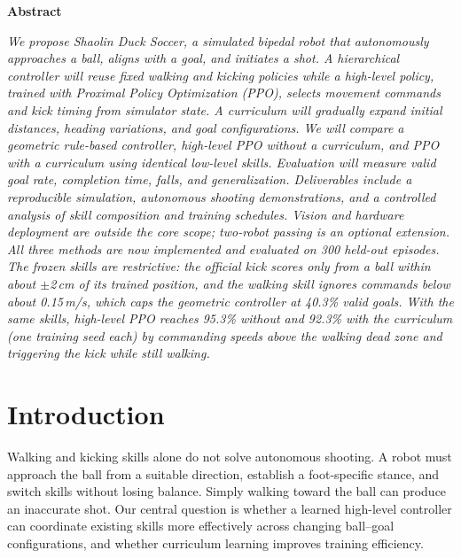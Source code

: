 \documentclass[10pt,twocolumn,letterpaper]{article}
\newcommand{\new}[1]{{\color{blue}#1}}
\begin{document}

\begin{center}\bfseries Abstract\end{center}
\noindent\textit{We propose Shaolin Duck Soccer, a simulated bipedal robot that autonomously approaches a ball, aligns with a goal, and initiates a shot. A hierarchical controller will reuse fixed walking and kicking policies while a high-level policy, trained with Proximal Policy Optimization (PPO), selects movement commands and kick timing from simulator state. A curriculum will gradually expand initial distances, heading variations, and goal configurations. We will compare a geometric rule-based controller, high-level PPO without a curriculum, and PPO with a curriculum using identical low-level skills. Evaluation will measure valid goal rate, completion time, falls, and generalization. Deliverables include a reproducible simulation, autonomous shooting demonstrations, and a controlled analysis of skill composition and training schedules. Vision and hardware deployment are outside the core scope; two-robot passing is an optional extension.
\new{All three methods are now implemented and evaluated on 300 held-out episodes. The frozen skills are restrictive: the official kick scores only from a ball within about $\pm$2\,cm of its trained position, and the walking skill ignores commands below about 0.15\,m/s, which caps the geometric controller at 40.3\% valid goals. With the same skills, high-level PPO reaches 95.3\% without and 92.3\% with the curriculum (one training seed each) by commanding speeds above the walking dead zone and triggering the kick while still walking.}}

\section{Introduction}
Walking and kicking skills alone do not solve autonomous shooting. A robot must approach the ball from a suitable direction, establish a foot-specific stance, and switch skills without losing balance. Simply walking toward the ball can produce an inaccurate shot. Our central question is whether a learned high-level controller can coordinate existing skills more effectively across changing ball--goal configurations, and whether curriculum learning improves training efficiency.
\end{document}
